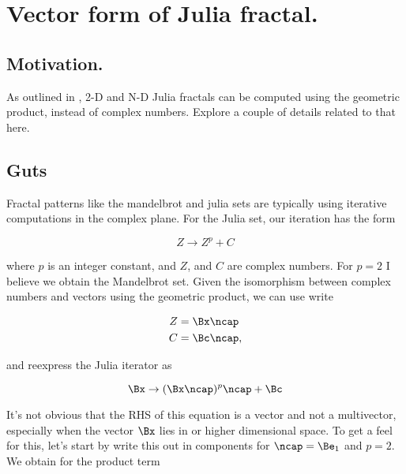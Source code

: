 
%

\chapter{Vector form of Julia fractal.}
\label{chap:juliaVector}
{}
\date{Dec 27, 2010}

\beginArtNoToc

\section{Motivation.}

As outlined in \cite{dorst2007gac}, 2-D and N-D Julia fractals can be computed using the geometric product, instead of complex numbers.  Explore a couple of details related to that here.

\section{Guts}

Fractal patterns like the mandelbrot and julia sets are typically using iterative computations in the complex plane.  For the Julia set, our iteration has the form

\begin{equation}\label{eqn:juliaFractal:10}
Z \rightarrow Z^p + C
\end{equation}

where $p$ is an integer constant, and $Z$, and $C$ are complex numbers.  For $p=2$ I believe we obtain the Mandelbrot set.  Given the isomorphism between complex numbers and vectors using the geometric product, we can use write

\begin{align}\label{eqn:juliaFractal:20}
Z &= \Bx \ncap \\
C &= \Bc \ncap,
\end{align}

and reexpress the Julia iterator as

\begin{equation}\label{eqn:juliaFractal:30}
\Bx \rightarrow (\Bx \ncap)^p \ncap + \Bc
\end{equation}

It's not obvious that the RHS of this equation is a vector and not a multivector, especially when the vector $\Bx$ lies in  or higher dimensional space.  To get a feel for this, let's start by write this out in components for $\ncap = \Be_1$ and $p=2$.  We obtain for the product term


